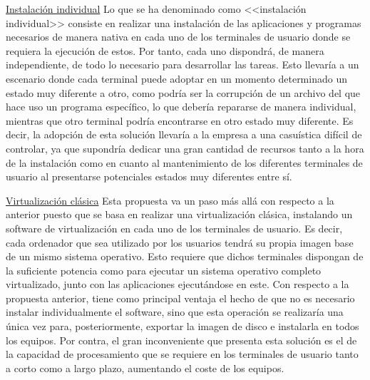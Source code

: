 \noindent\underline{Instalación individual}\newline
\indent Lo que se ha denominado como <<instalación individual>> consiste en realizar una instalación de las aplicaciones y programas necesarios de manera nativa en cada uno de los terminales de usuario donde se requiera la ejecución de estos. Por tanto, cada uno dispondrá, de manera independiente, de todo lo necesario para desarrollar las tareas. Esto llevaría a un escenario donde cada terminal puede adoptar en un momento determinado un estado muy diferente a otro, como podría ser la corrupción de un archivo del que hace uso un programa específico, lo que debería repararse de manera individual, mientras que otro terminal podría encontrarse en otro estado muy diferente. Es decir, la adopción de esta solución llevaría a la empresa a una casuística difícil de controlar, ya que supondría dedicar una gran cantidad de recursos tanto a la hora de la instalación como en cuanto al mantenimiento de los diferentes terminales de usuario al presentarse potenciales estados muy diferentes entre sí.

\noindent\underline{Virtualización clásica}\newline
\indent Esta propuesta va un paso más allá con respecto a la anterior puesto que se basa en realizar una virtualización clásica, instalando un software de virtualización en cada uno de los terminales de usuario. Es decir, cada ordenador que sea utilizado por los usuarios tendrá su propia imagen base de un mismo sistema operativo. Esto requiere que dichos terminales dispongan de la suficiente potencia como para ejecutar un sistema operativo completo virtualizado, junto con las aplicaciones ejecutándose en este. Con respecto a la propuesta anterior, tiene como principal ventaja el hecho de que no es necesario instalar individualmente el software, sino que esta operación se realizaría una única vez para, posteriormente, exportar la imagen de disco e instalarla en todos los equipos. Por contra, el gran inconveniente que presenta esta solución es el de la capacidad de procesamiento que se requiere en los terminales de usuario tanto a corto como a largo plazo, aumentando el coste de los equipos.

\clearpage

